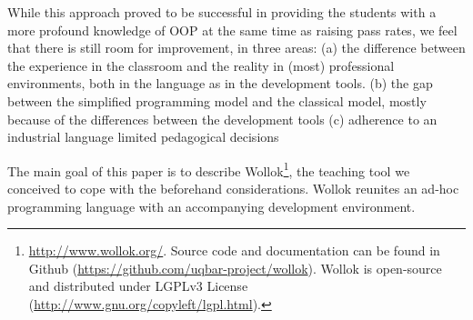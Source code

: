 While this approach proved to be successful in providing the students with a more profound knowledge of OOP at the same time as raising pass rates, 
we feel that there is still room for improvement, in three areas:
(a) the difference between the experience in the classroom and the reality in (most) professional environments, both in the language as in the development tools.
(b) the gap between the simplified programming model and the classical model, mostly because of the differences between the development tools
(c) adherence to an industrial language limited pedagogical decisions


\medskip
The main goal of this paper is to describe Wollok\footnote{
	\url{http://www.wollok.org/}. 
	Source code and documentation can be found in Github 
	(\url{https://github.com/uqbar-project/wollok}).
	Wollok is open-source and distributed under LGPLv3 License 
	(\url{http://www.gnu.org/copyleft/lgpl.html}).}, 
the teaching tool we conceived to cope with the beforehand considerations.
Wollok reunites an ad-hoc programming language with an accompanying development environment. 

